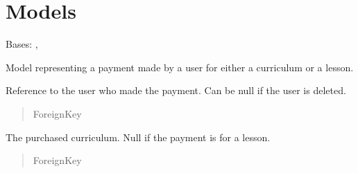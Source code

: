 \documentclass[letterpaper,10pt,english]{sphinxmanual}
\begin{document}
\section{Models}
\label{\detokenize{payments:module-payments.models}}\label{\detokenize{payments:models}}

\begin{fulllineitems}
\label{\detokenize{payments:payments.models.Payment}}
\pysigstartsignatures
\pysiglinewithargsret
{}
{\sphinxparamcomma {}}
{}
\pysigstopsignatures
\sphinxAtStartPar
Bases: {\hyperref[\detokenize{core:core.models.AuditableMixin}]{}}, 

\sphinxAtStartPar
Model representing a payment made by a user for either a curriculum or a lesson.

\begin{fulllineitems}
\label{\detokenize{payments:payments.models.Payment.user}}
\pysigstartsignatures
\pysigline
{}
\pysigstopsignatures
\sphinxAtStartPar
Reference to the user who made the payment. Can be null if the user is deleted.
\begin{quote}\begin{description}
\sphinxAtStartPar
ForeignKey

\end{description}\end{quote}

\end{fulllineitems}


\begin{fulllineitems}
\label{\detokenize{payments:payments.models.Payment.curriculum}}
\pysigstartsignatures
\pysigline
{}
\pysigstopsignatures
\sphinxAtStartPar
The purchased curriculum. Null if the payment is for a lesson.
\begin{quote}\begin{description}
\sphinxAtStartPar
ForeignKey


\end{description}
\end{quote}
\end{fulllineitems}
\end{fulllineitems}
\end{document}
